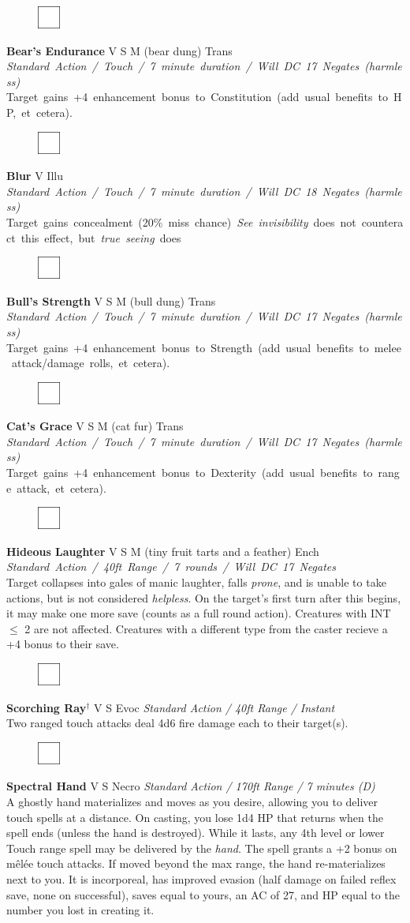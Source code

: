 \documentclass[letterpaper]{article}
\newcommand{\e}[1]{\emph{#1}}
\newcommand{\B}[1]{\textbf{#1}}
\newcommand{\D}[0]{$^\dag$}
\newcommand{\spell}[7]{
\begin{figure}
\vspace{-13pt}
\ifstrequal{#2}{Full}{  \includegraphics[width=2em]{Checkbox-Full}}{
\ifstrequal{#2}{Scroll}{\includegraphics[width=2em]{Checkbox-S}}{
                        \includegraphics[width=2em]{Checkbox}}}
\ifstrequal{#7}{}{\vspace{-1em}}{\vspace{#7}}
\end{figure}
 \B{#1} #3 {
    \ifstrequal{#4}{Conj}{\color{Plum}Conj}{%
    \ifstrequal{#4}{Divin}{\color{YellowOrange}Divin}{%
    \ifstrequal{#4}{Ench}{\color{VioletRed}Ench}{%
    \ifstrequal{#4}{Trans}{\color{LimeGreen}Trans}{%
    \ifstrequal{#4}{Evoc}{\color{RedOrange}Evoc}{%
    \ifstrequal{#4}{Illu}{\color{ProcessBlue}Illu}{%
    \ifstrequal{#4}{Abjur}{\color{CadetBlue}Abjur}{%
    \ifstrequal{#4}{Necro}{\color{Red}Necro}{%
}}}}}}}}}
{\footnotesize \e{#5}} \\
#6
}
\begin{document}
\spell{Bear's Endurance}{}{V S M (bear dung)}{Trans}{\mbox{Standard Action / Touch / 7 minute duration / Will DC 17 Negates (harmless)}} {%
\mbox{Target gains +4 enhancement bonus to Constitution (add usual benefits to HP, et cetera).} }{}\\[-1em] %

\spell{Blur}{}{V}{Illu}{\mbox{Standard Action / Touch / 7 minute duration / Will DC 18 Negates (harmless)}}{%
\mbox{Target gains concealment (20\% miss chance) \e{See invisibility} does not counteract this effect, but \e{true seeing} does} }{}\\[-1em] %

\spell{Bull's Strength}{}{V S M (bull dung)}{Trans}{\mbox{Standard Action / Touch / 7 minute duration / Will DC 17 Negates (harmless)}}{%
\mbox{Target gains +4 enhancement bonus to Strength (add usual benefits to melee attack/damage rolls, et cetera).} }{}\\[-1em] %

\spell{Cat's Grace}{}{V S M (cat fur)}{Trans}{\mbox{Standard Action / Touch / 7 minute duration / Will DC 17 Negates (harmless)}}{%
\mbox{Target gains +4 enhancement bonus to Dexterity (add usual benefits to range attack, et cetera).} }{}\\[-1em] %

\spell{Hideous Laughter}{}{V S M (tiny fruit tarts and a feather)}{Ench}{\mbox{Standard Action / 40ft Range / 7 rounds / Will DC 17 Negates }}{%
Target collapses into gales of manic laughter, falls \e{prone}, and is unable to take actions, but is not considered \e{helpless}. On the target's first turn after this begins, it may make one more save (counts as a full round action).  Creatures with INT $\leq$ 2 are not affected.  Creatures with a different type from the caster recieve a +4 bonus to their save.}{0em} %

\spell{Scorching Ray\D}{}{V S}{Evoc}{Standard Action / 40ft Range / Instant}{%
Two ranged touch attacks deal 4d6 fire damage each to their target(s).}{}\\[-1em] %

\spell{Spectral Hand}{}{V S}{Necro}{\e{Standard Action / 170ft Range / 7 minutes (D)}}{%
A ghostly hand materializes and moves as you desire, allowing you to deliver touch spells at a distance.  On casting, you lose 1d4 HP that returns when the spell ends (unless the hand is destroyed).  While it lasts, any 4th level or lower Touch range spell may be delivered by the \e{hand}.  The spell grants a +2 bonus on m\^{e}l\'{e}e touch attacks. If moved beyond the max range, the hand re-materializes next to you.  It is incorporeal, has improved evasion (half damage on failed reflex save, none on successful), saves equal to yours, an AC of 27, and HP equal to the number you lost in creating it.}{2em}\\[-1em] %
\end{document}

